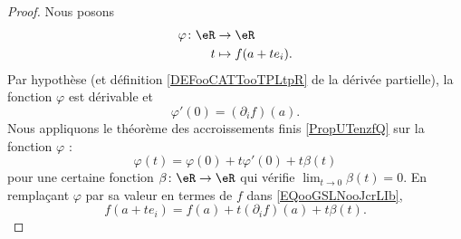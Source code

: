 \begin{proof}
	Nous posons
	\begin{equation}
		\begin{aligned}
			\varphi\colon \eR & \to \eR             \\
			t                 & \mapsto f(a+ te_i).
		\end{aligned}
	\end{equation}
	Par hypothèse (et définition \ref{DEFooCATTooTPLtpR} de la dérivée partielle), la fonction \( \varphi\) est dérivable et
	\begin{equation}
		\varphi'(0)=(\partial_if)(a).
	\end{equation}
	Nous appliquons le théorème des accroissements finis \ref{PropUTenzfQ} sur la fonction \( \varphi\) :
	\begin{equation}        \label{EQooGSLNooJcrLIb}
		\varphi(t)=\varphi(0)+t\varphi'(0)+t\beta(t)
	\end{equation}
	pour une certaine fonction \( \beta\colon \eR\to \eR\) qui vérifie \( \lim_{t\to 0} \beta(t)=0\). En remplaçant \( \varphi\) par sa valeur en termes de \( f\) dans \eqref{EQooGSLNooJcrLIb},
	\begin{equation}
		f(a+te_i)=f(a)+t(\partial_if)(a)+t\beta(t).
	\end{equation}
\end{proof}
